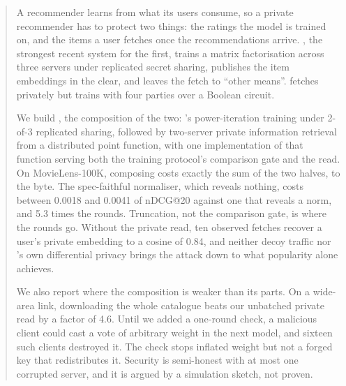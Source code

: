 \begin{abstract}
\noindent
A recommender learns from what its users consume, so a private recommender has
to protect two things: the ratings the model is trained on, and the items a
user fetches once the recommendations arrive. \nudgeplain{}, the strongest
recent system for the first, trains a matrix factorisation across three servers
under replicated secret sharing, publishes the item embeddings in the clear, and
leaves the fetch to ``other means''. \pirsonaplain{} fetches privately but
trains with four parties over a Boolean circuit.

We build \sys{}, the composition of the two: \nudgeplain{}'s power-iteration
training under 2-of-3 replicated sharing, followed by two-server private
information retrieval from a distributed point function, with one implementation
of that function serving both the training protocol's comparison gate and the
read. On MovieLens-100K, composing costs exactly the sum of the two halves, to
the byte. The spec-faithful normaliser, which reveals nothing, costs between
0.0018 and 0.0041 of nDCG@20 against one that reveals a norm, and 5.3 times the
rounds. Truncation, not the comparison gate, is where the rounds go. Without the
private read, ten observed fetches recover a user's private embedding to a cosine
of 0.84, and neither decoy traffic nor \nudgeplain{}'s own differential privacy
brings the attack down to what popularity alone achieves.

We also report where the composition is weaker than its parts. On a wide-area
link, downloading the whole catalogue beats our unbatched private read by a
factor of 4.6. Until we added a one-round check, a malicious client could cast a
vote of arbitrary weight in the next model, and sixteen such clients destroyed
it. The check stops inflated weight but not a forged key that redistributes it.
Security is semi-honest with at most one corrupted server, and it is argued by a
simulation sketch, not proven.
\end{abstract}
